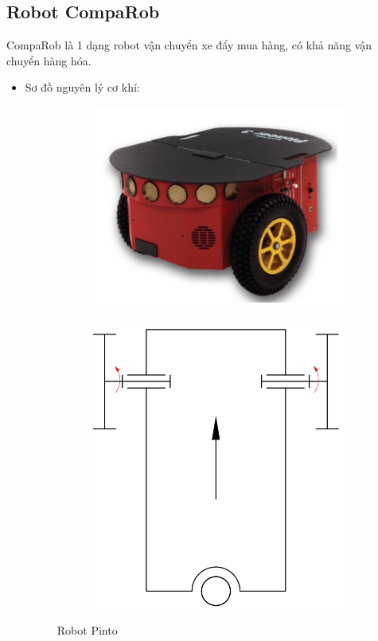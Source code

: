     \subsection{Robot CompaRob}
        \hspace*{0.6cm} CompaRob là 1 dạng robot vận chuyển xe đẩy mua hàng, có khả năng vận chuyển hàng hóa.
        \begin{itemize}
            \item Sơ đồ nguyên lý cơ khí:
            \begin{figure}[H]
                \begin{subfigure}{0.5\textwidth}
                \centering
                \includegraphics[width=0.6\linewidth, right]{pictures/chapter1/chapter1_pic11a_comparob.png} 
                \label{chap1_pic11a}
                \end{subfigure}
                \begin{subfigure}{0.6\textwidth}
                \includegraphics[width=0.5\linewidth]{pictures/chapter1/chapter1_pic11b_pinto.png}
                \label{chap1_pic11b}
                \end{subfigure}
                \caption{Robot Pinto}
                \label{chap1_pic11}
            \end{figure}

\end{itemize}

